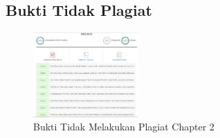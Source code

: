 \subsection{Bukti Tidak Plagiat}
\begin{figure}[H]
	\includegraphics[width=4cm]{figures/1174003/2/plagiat/plagiat.png}
	\centering
	\caption{Bukti Tidak Melakukan Plagiat Chapter 2}
\end{figure}